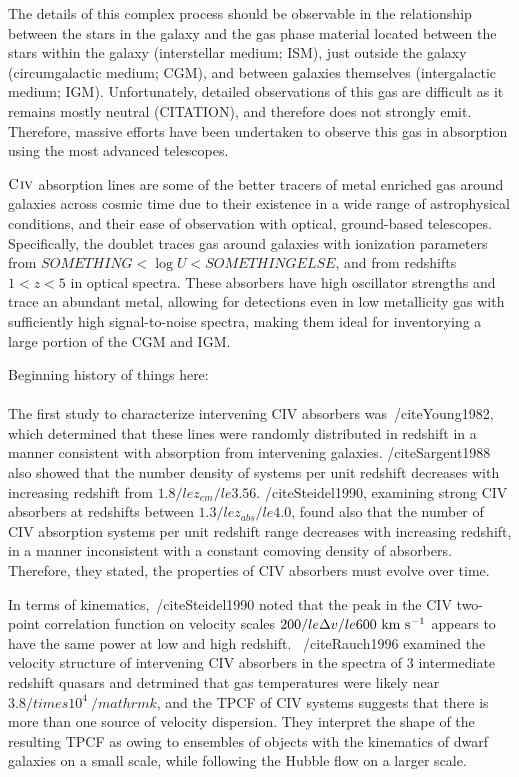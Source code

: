 \documentclass[linenumbers,twocolumn]{aastex61}
\begin{document}
The details of this complex process should be observable in the relationship between the stars in the galaxy and the gas phase material located between the stars within the galaxy (interstellar medium; ISM), just outside the galaxy (circumgalactic medium; CGM), and between galaxies themselves (intergalactic medium; IGM). Unfortunately, detailed observations of this gas are difficult as it remains mostly neutral (CITATION), and therefore does not strongly emit. Therefore, massive efforts have been undertaken to observe this gas in absorption using the most advanced telescopes.

${\hbox{{\rm C}\kern 0.1em{\sc iv}}}$ absorption lines are some of the better tracers of metal enriched gas around galaxies across cosmic time due to their existence in a wide range of astrophysical conditions, and their ease of observation with optical, ground-based telescopes. Specifically, the {\CIVdblt} doublet traces gas around galaxies with ionization parameters from $SOMETHING < \log U < SOMETHING ELSE$, and from redshifts $1 < z < 5$ in optical spectra. These absorbers have high oscillator strengths and trace an abundant metal, allowing for detections even in low metallicity gas with sufficiently high signal-to-noise spectra, making them ideal for inventorying a large portion of the CGM and IGM.

Beginning history of things here:\\\\

The first study to characterize intervening CIV absorbers was~/cite{Young1982}, which determined that these lines were randomly distributed in redshift in a manner consistent with absorption from intervening galaxies. /cite{Sargent1988} also showed that the number density of systems per unit redshift decreases with increasing redshift from $1.8 /le z_{em} /le 3.56$. /cite{Steidel1990}, examining strong CIV absorbers at redshifts between $1.3 /le z_{abs} /le 4.0$, found also that the number of CIV absorption systems per unit redshift range decreases with increasing redshift, in a manner inconsistent with a constant comoving density of absorbers. Therefore, they stated, the properties of CIV absorbers must evolve over time.

In terms of kinematics,~/cite{Steidel1990} noted that the peak in the CIV two-point correlation function on velocity scales $200 /le \Delta v /le 600~{\hbox{km~s$^{-1}$}}$ appears to have the same power at low and high redshift. ~/cite{Rauch1996} examined the velocity structure of intervening CIV absorbers in the spectra of 3 intermediate redshift quasars and detrmined that gas temperatures were likely near $3.8 /times 10^4~/mathrm{k}$, and the TPCF of CIV systems suggests that there is more than one source of velocity dispersion. They interpret the shape of the resulting TPCF as owing to ensembles of objects with the kinematics of dwarf galaxies on a small scale, while following the Hubble flow on a larger scale. %
\end{document}
